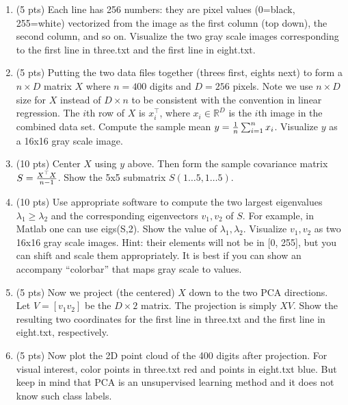 \documentclass[a4paper]{article}
\theoremstyle{definition}
\def\R{\mathbb R}
\begin{document}
\begin{enumerate}
\item (5 pts) Each line has 256 numbers: they are pixel values (0=black, 255=white) vectorized from the image as the first column (top down), the second column, and so on.
Visualize the two gray scale images corresponding to the first line in three.txt and the first line in eight.txt.

\item (5 pts) Putting the two data files together (threes first, eights next) to form a $n \times D$ matrix $X$ where $n=400$ digits and $D=256$ pixels.  Note we use $n\times D$ size for $X$ instead of $D\times n$ to be consistent with the convention in linear regression.   The $i$th row of $X$ is $x_i^\top$, where $x_i \in \R^D$ is the $i$th image in the combined data set.
Compute the sample mean $y = {1\over n} \sum_{i=1}^n x_i$.
Visualize $y$ as a 16x16 gray scale image.

\item (10 pts) Center $X$ using $y$ above.  Then form the sample covariance matrix $S={X^\top X \over n-1}$.
Show the 5x5 submatrix $S(1\ldots 5, 1 \ldots 5)$.

\item (10 pts) Use appropriate software to compute the two largest eigenvalues $\lambda_1 \ge \lambda_2$ and the corresponding eigenvectors $v_1, v_2$ of $S$.
For example, in Matlab one can use eigs(S,2).  
Show the value of $\lambda_1, \lambda_2$.
Visualize $v_1, v_2$ as two 16x16 gray scale images.
Hint: their elements will not be in [0, 255], but you can shift and scale them appropriately.  It is best if you can show an accompany ``colorbar'' that maps gray scale to values. 

\item (5 pts) Now we project (the centered) $X$ down to the two PCA directions.   Let $V=[v_1 v_2]$ be the $D\times 2$ matrix.  The projection is simply $XV$.
Show the resulting two coordinates for the first line in three.txt and the first line in eight.txt, respectively.

\item (5 pts) Now plot the 2D point cloud of the 400 digits after projection.
For visual interest, color points in three.txt red and points in eight.txt blue.
But keep in mind that PCA is an unsupervised learning method and it does not know such class labels.

\end{enumerate}
\end{document}
